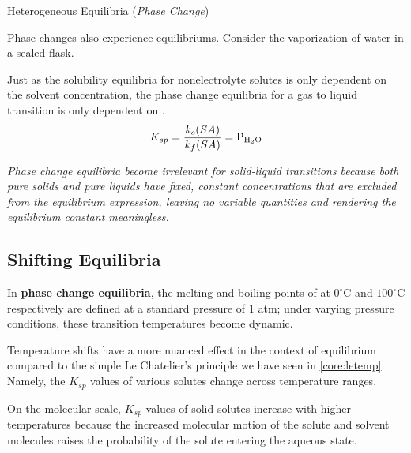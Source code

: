 \documentclass[10pt]{article}
\begin{document}
    \begin{core}{Heterogeneous Equilibria (\textit{Phase Change})}

      Phase changes also experience equilibriums. Consider the vaporization of water in a sealed flask. 




      Just as the solubility equilibria for nonelectrolyte solutes is only dependent on the solvent concentration, the phase change equilibria for a gas to liquid transition is only dependent on .
      \[
        K_{sp} = \frac{k_c(SA)}{k_f(SA)} = \ce{P_{\ce{H2O}}}
      \]


      \textit{Phase change equilibria become irrelevant for solid-liquid transitions because both pure solids and pure liquids have fixed, constant concentrations that are excluded from the equilibrium expression, leaving no variable quantities and rendering the equilibrium constant meaningless.}

    \end{core}

  \subsection{Shifting Equilibria}
    \label{sec:shifting_eq}

    In \textbf{phase change equilibria}, the melting and boiling points of  at $0^\circ$C and $100^\circ$C respectively are defined at a standard pressure of 1 atm; under varying pressure conditions, these transition temperatures become dynamic.


    Temperature shifts have a more nuanced effect in the context of equilibrium compared to the simple Le Chatelier's principle we have seen in \autoref{core:letemp}. Namely, the $K_{sp}$ values of various solutes change across temperature ranges.

    On the molecular scale, $K_{sp}$ values of solid solutes increase with higher temperatures because the increased molecular motion of the solute and solvent molecules raises the probability of the solute entering the aqueous state.
\end{document}
